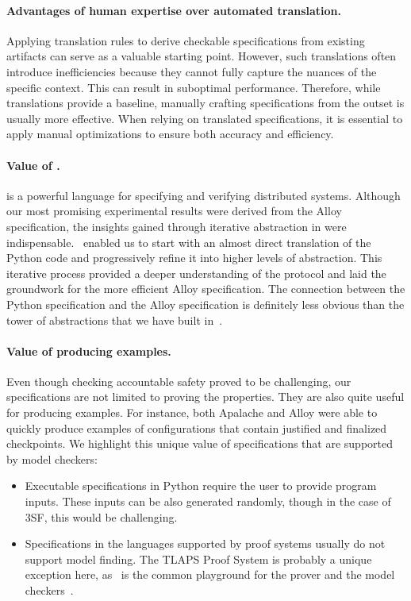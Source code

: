 \paragraph{Advantages of human expertise over automated translation.} Applying
translation rules to derive checkable specifications from existing artifacts can
serve as a valuable starting point. However, such translations often introduce
inefficiencies because they cannot fully capture the nuances of the specific
context. This can result in suboptimal performance. Therefore, while
translations provide a baseline, manually crafting specifications from the
outset is usually more effective. When relying on translated specifications, it is
essential to apply manual optimizations to ensure both accuracy and efficiency.

\paragraph{Value of \tlap{}.} \tlap{} is a powerful language for specifying and
verifying distributed systems. Although our most promising experimental results
were derived from the Alloy specification, the insights gained through
iterative abstraction in \tlap{} were indispensable.\ \tlap{} enabled us to
start with an almost direct translation of the Python code and progressively
refine it into higher levels of abstraction. This iterative process provided a
deeper understanding of the protocol and laid the groundwork for the more
efficient Alloy specification. The connection between the Python specification
and the Alloy specification is definitely less obvious than the tower of
abstractions that we have built in~\tlap{}.

\paragraph{Value of producing examples.} Even though checking accountable
safety proved to be challenging, our specifications are not limited to proving
the properties. They are also quite useful for producing examples. For
instance, both Apalache and Alloy were able to quickly produce examples of
configurations that contain justified and finalized checkpoints. We highlight
this unique value of specifications that are supported by model checkers:

\begin{itemize}

  \item Executable specifications in Python require the user to provide program
    inputs. These inputs can be also generated randomly, though in the case of
    3SF, this would be challenging.

  \item Specifications in the languages supported by proof systems usually do
    not support model finding. The TLAPS Proof System is probably a unique
    exception here, as~\tlap{} is the common playground for the prover and the
    model checkers~\cite{KonnovKM22}.

\end{itemize}

